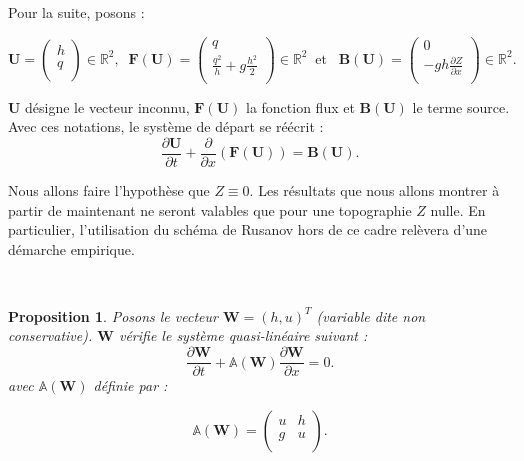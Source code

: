 \documentclass[
11pt, %
francais, %
singlespacing, %
headsepline, %
f%
]{MastersDoctoralThesis} %
\newtheorem{prop}{Proposition}
\theoremstyle{definition}
\begin{document}
Pour la suite, posons :

\begin{center}

$\textbf{U}=\begin{pmatrix}
   h \\
    q \\
\end{pmatrix}\in\mathbb{R}^{2},  \phantom{..} \textbf{F} (\textbf{U}) =\begin{pmatrix}
   q \\
   \frac{q^{2}}{h}+g\frac{h^{2}}{2} \\
\end{pmatrix}\in\mathbb{R}^{2} \phantom{..} \text{et} \phantom{...} \textbf{B} (\textbf{U}) =\begin{pmatrix}
   0 \\
   -gh \frac{\partial Z}{\partial x}\\
\end{pmatrix}\in\mathbb{R}^{2}.
$
\end{center}

$\textbf{U}$ désigne le vecteur inconnu, $\textbf{F} (\textbf{U})$ la fonction flux et $\textbf{B} (\textbf{U})$ le terme source. Avec ces notations,
le système de départ se réécrit : $$\frac{\partial\textbf{U}}{\partial t}+\frac{\partial}{\partial x}(\textbf{F} (\textbf{U})) = \textbf{B} (\textbf{U}).$$

Nous allons faire l'hypothèse que $Z \equiv 0$. Les résultats que nous allons montrer à partir de maintenant ne seront valables que pour une topographie $Z$ nulle.
En particulier, l'utilisation du schéma de Rusanov hors de ce cadre relèvera d'une démarche empirique.

\

\begin{prop}
Posons le vecteur $\textbf{W}= (h, u)^{T}$ (variable dite non conservative). $\textbf{W}$ vérifie le système quasi-linéaire suivant :
$$ \frac{\partial \textbf{W}}{\partial t} +\mathbb{A}(\textbf{W}) \frac{\partial\textbf{W}}{\partial x} = 0.\label{ql} $$
avec $\mathbb{A}(\textbf{W})$ définie par :

$$\mathbb{A}(\textbf{W}) =\begin{pmatrix}
   u & h  \\
   g & u  \\
\end{pmatrix}.$$

\end{prop}
\end{document}
